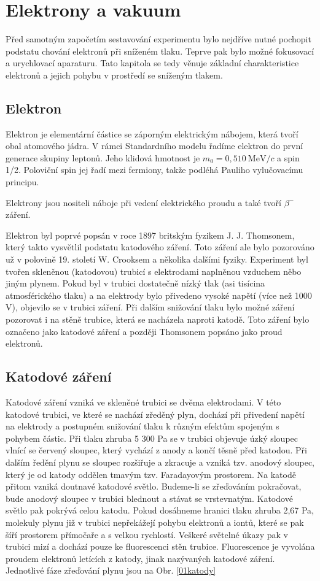 \newpage
\chapter{Elektrony a vakuum}
Před samotným započetím sestavování experimentu bylo nejdříve nutné pochopit podstatu chování elektronů při sníženém tlaku. Teprve pak bylo možné fokusovací a urychlovací aparaturu. Tato kapitola se tedy věnuje základní charakteristice elektronů a jejich pohybu v prostředí se sníženým tlakem.

\section{Elektron}
Elektron je elementární částice se záporným elektrickým nábojem, která tvoří obal atomového jádra. V rámci Standardního modelu řadíme elektron do první generace skupiny leptonů. Jeho klidová hmotnost je $m_{0}=0,510~\mathrm{MeV}/c$ \cite{01Elektron} a spin 1/2. Poloviční spin jej řadí mezi fermiony, takže podléhá Pauliho vylučovacímu principu.

Elektrony jsou nositeli náboje při vedení elektrického proudu a také tvoří $\beta^{-}$ záření.

Elektron byl poprvé popsán v roce 1897 britským fyzikem J. J. Thomsonem, který takto vysvětlil podstatu katodového záření. Toto záření ale bylo pozorováno už v polovině 19. století W. Crooksem a několika dalšími fyziky. Experiment byl tvořen skleněnou (katodovou) trubicí s elektrodami naplněnou vzduchem něbo jiným plynem. Pokud byl v trubici dostatečně nízký tlak (asi tisícina atmosférického tlaku) a na elektrody bylo přivedeno vysoké napětí (více než 1000 V), objevilo se v trubici záření. Při dalším snižování tlaku bylo možné záření pozorovat i na stěně trubice, která se nacházela naproti katodě. Toto záření bylo označeno jako katodové záření a později Thomsonem popsáno jako proud elektronů.

\section{Katodové záření}
Katodové záření vzniká ve skleněné trubici se dvěma elektrodami. V této katodové trubici, ve které se nachází zředěný plyn, dochází při přivedení napětí na elektrody a postupném snižování tlaku k různým efektům spojeným s pohybem částic. Při tlaku zhruba 5 300 Pa se v trubici objevuje úzký sloupec vlnící se červený sloupec, který vychází z anody a končí těsně před katodou. Při dalším ředění plynu se sloupec rozšiřuje a zkracuje a vzniká tzv. anodový sloupec, který je od katody oddělen tmavým tzv. Faradayovým prostorem. Na katodě přitom vzniká doutnavé katodové světlo. Budeme-li se zřeďováním pokračovat, bude anodový sloupec v trubici blednout a stávat se vrstevnatým. Katodové světlo pak pokrývá celou katodu. Pokud dosáhneme hranici tlaku zhruba 2,67 Pa, molekuly plynu již v trubici nepřekážejí pohybu elektronů a iontů, které se pak šíří prostorem přímočaře a s velkou rychlostí. Veškeré světelné úkazy pak v trubici mizí a dochází pouze ke fluorescenci stěn trubice. Fluorescence je vyvolána proudem elektronů letících z katody, jinak nazývaných katodové záření. Jednotlivé fáze zřeďování plynu jsou na Obr. \ref{01katody}

